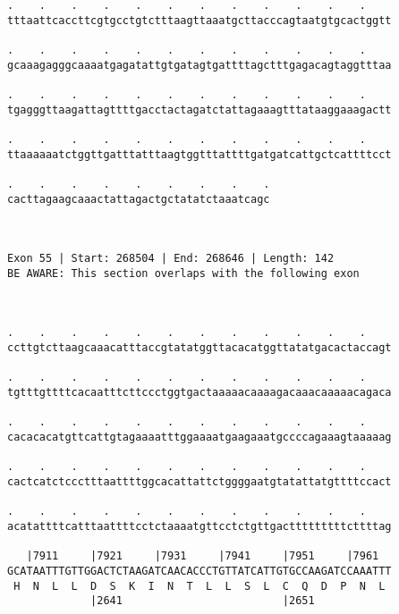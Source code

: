 \documentclass{article}
\begin{document}
\begin{Verbatim}
.    .    .    .    .    .    .    .    .    .    .    .    
tttaattcaccttcgtgcctgtctttaagttaaatgcttacccagtaatgtgcactggtt
                                                            
.    .    .    .    .    .    .    .    .    .    .    .    
gcaaagagggcaaaatgagatattgtgatagtgattttagctttgagacagtaggtttaa
                                                            
.    .    .    .    .    .    .    .    .    .    .    .    
tgagggttaagattagttttgacctactagatctattagaaagtttataaggaaagactt
                                                            
.    .    .    .    .    .    .    .    .    .    .    .    
ttaaaaaatctggttgatttatttaagtggtttattttgatgatcattgctcattttcct
                                                            
.    .    .    .    .    .    .    .    .
cacttagaagcaaactattagactgctatatctaaatcagc
                                         
                                         
 
Exon 55 | Start: 268504 | End: 268646 | Length: 142
BE AWARE: This section overlaps with the following exon



.    .    .    .    .    .    .    .    .    .    .    .    
ccttgtcttaagcaaacatttaccgtatatggttacacatggttatatgacactaccagt
                                                            
.    .    .    .    .    .    .    .    .    .    .    .    
tgtttgttttcacaatttcttccctggtgactaaaaacaaaagacaaacaaaaacagaca
                                                            
.    .    .    .    .    .    .    .    .    .    .    .    
cacacacatgttcattgtagaaaatttggaaaatgaagaaatgccccagaaagtaaaaag
                                                            
.    .    .    .    .    .    .    .    .    .    .    .    
cactcatctccctttaattttggcacattattctggggaatgtatattatgttttccact
                                                            
.    .    .    .    .    .    .    .    .    .    .    .    
acatattttcatttaattttcctctaaaatgttcctctgttgactttttttttcttttag
                                                            
   |7911     |7921     |7931     |7941     |7951     |7961  
GCATAATTTGTTGGACTCTAAGATCAACACCCTGTTATCATTGTGCCAAGATCCAAATTT
 H  N  L  L  D  S  K  I  N  T  L  L  S  L  C  Q  D  P  N  L 
             |2641                         |2651            
  

\end{Verbatim}
\end{document}
